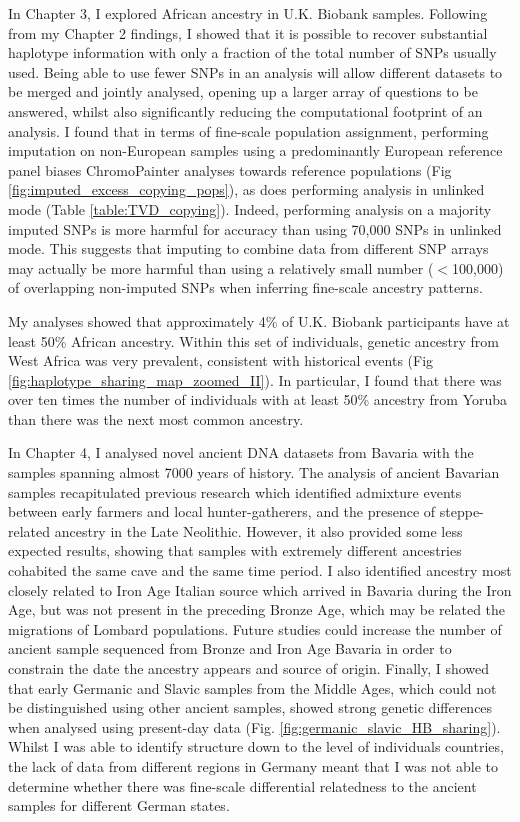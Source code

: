 In Chapter 3, I explored African ancestry in U.K. Biobank samples. Following from my Chapter 2 findings, I showed that it is possible to recover substantial haplotype information with only a fraction of the total number of SNPs usually used. Being able to use fewer SNPs in an analysis will allow different datasets to be merged and jointly analysed, opening up a larger array of questions to be answered, whilst also significantly reducing the computational footprint of an analysis. I found that in terms of fine-scale population assignment, performing imputation on non-European samples using a predominantly European reference panel biases ChromoPainter analyses towards reference populations (Fig \ref{fig:imputed_excess_copying_pops}), as does performing analysis in unlinked mode (Table \ref{table:TVD_copying}). Indeed, performing analysis on a majority imputed SNPs is more harmful for accuracy than using 70,000 SNPs in unlinked mode. This suggests that imputing to combine data from different SNP arrays may actually be more harmful than using a relatively small number ($<$100,000) of overlapping non-imputed SNPs when inferring fine-scale ancestry patterns.

My analyses showed that approximately 4\% of U.K. Biobank participants have at least 50\% African ancestry. Within this set of individuals, genetic ancestry from West Africa was very prevalent, consistent with historical events (Fig \ref{fig:haplotype_sharing_map_zoomed_II}). In particular, I found that there was over ten times the number of individuals with at least 50\% ancestry from Yoruba than there was the next most common ancestry. 

In Chapter 4, I analysed novel ancient DNA datasets from Bavaria with the samples spanning almost 7000 years of history. The analysis of ancient Bavarian samples recapitulated previous research which identified admixture events between early farmers and local hunter-gatherers, and the presence of steppe-related ancestry in the Late Neolithic. However, it also provided some less expected results, showing that samples with extremely different ancestries cohabited the same cave and the same time period. I also identified ancestry most closely related to Iron Age Italian source which arrived in Bavaria during the Iron Age, but was not present in the preceding Bronze Age, which may be related the migrations of Lombard populations. Future studies could increase the number of ancient sample sequenced from Bronze and Iron Age Bavaria in order to constrain the date the ancestry appears and source of origin. Finally, I showed that early Germanic and Slavic samples from the Middle Ages, which could not be distinguished using other ancient samples, showed strong genetic differences when analysed using present-day data (Fig. \ref{fig:germanic_slavic_HB_sharing}). Whilst I was able to identify structure down to the level of individuals countries, the lack of data from different regions in Germany meant that I was not able to determine whether there was fine-scale differential relatedness to the ancient samples for different German states. 

